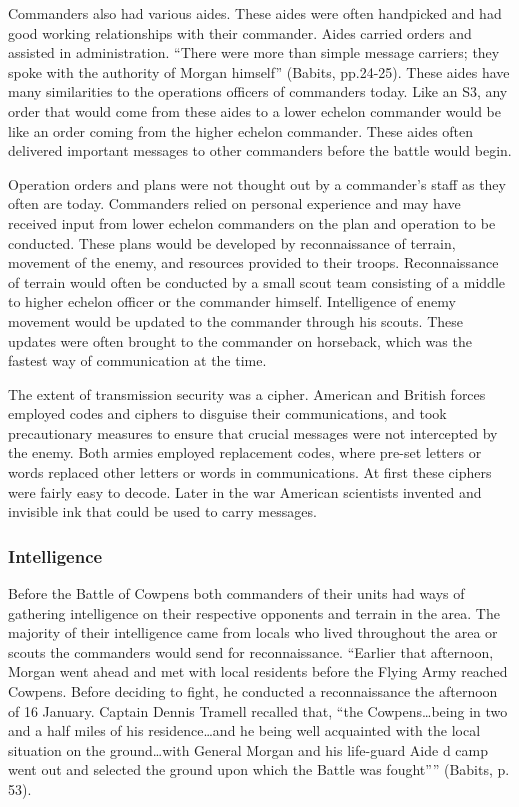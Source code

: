  Commanders also had various aides.  These aides were often handpicked and had
good working relationships with their commander.  Aides carried orders and
assisted in administration.  “There were more than simple message carriers; they
spoke with the authority of Morgan himself” (Babits, pp.24-25).  These aides
have many similarities to the operations officers of commanders today.  Like an
S3, any order that would come from these aides to a lower echelon commander
would be like an order coming from the higher echelon commander.  These aides
often delivered important messages to other commanders before the battle would
begin.

Operation orders and plans were not thought out by a commander’s staff as they
often are today.  Commanders relied on personal experience and may have received
input from lower echelon commanders on the plan and operation to be conducted.
These plans would be developed by reconnaissance of terrain, movement of the
enemy, and resources provided to their troops.  Reconnaissance of terrain would
often be conducted by a small scout team consisting of a middle to higher
echelon officer or the commander himself.  Intelligence of enemy movement would
be updated to the commander through his scouts.  These updates were often
brought to the commander on horseback, which was the fastest way of
communication at the time.

The extent of transmission security was a cipher.  American and British forces
employed codes and ciphers to disguise their communications, and took
precautionary measures to ensure that crucial messages were not intercepted by
the enemy. Both armies employed replacement codes, where pre-set letters or
words replaced other letters or words in communications.  At first these ciphers
were fairly easy to decode.  Later in the war American scientists invented and
invisible ink that could be used to carry messages.    

\subsubsection{Intelligence}

Before the Battle of Cowpens both commanders of their units had ways of
gathering intelligence on their respective opponents and terrain in the area.
The majority of their intelligence came from locals who lived throughout the
area or scouts the commanders would send for reconnaissance.  “Earlier that
afternoon, Morgan went ahead and met with local residents before the Flying Army
reached Cowpens.  Before deciding to fight, he conducted a reconnaissance the
afternoon of 16 January.  Captain Dennis Tramell recalled that, “the
Cowpens…being in two and a half miles of his residence…and he being well
acquainted with the local situation on the ground…with General Morgan and his
life-guard Aide d camp went out and selected the ground upon which the Battle
was fought”” (Babits, p. 53).  

